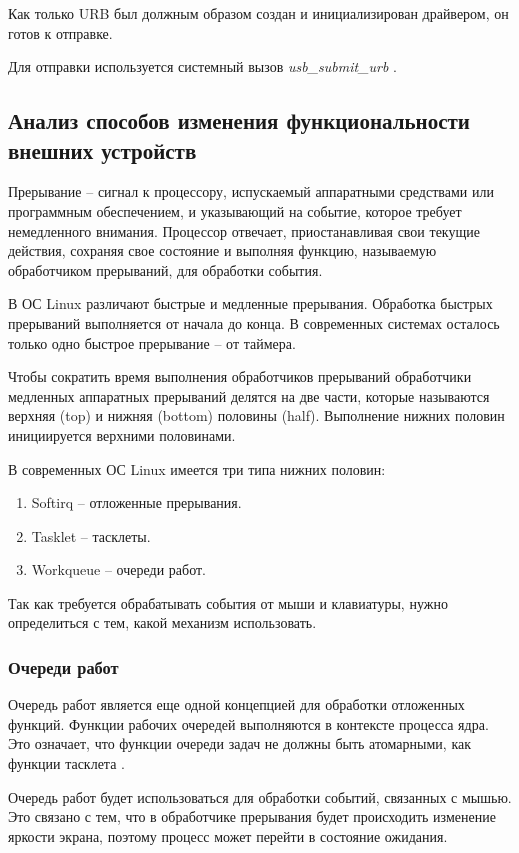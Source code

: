 Как только URB был должным образом создан и инициализирован драйвером, он готов к отправке. 

Для отправки используется системный вызов \textit{usb\_submit\_urb} \cite{submit}.

\subsection{Анализ способов изменения функциональности внешних устройств}
Прерывание – сигнал к процессору, испускаемый аппаратными средствами или программным обеспечением, и указывающий на событие, которое
требует немедленного внимания.  
Процессор отвечает, приостанавливая свои текущие действия, сохраняя свое состояние и выполняя функцию, называемую обработчиком прерываний, для обработки события.

В ОС Linux различают быстрые и медленные прерывания. 
Обработка быстрых прерываний выполняется от начала до конца. 
В современных системах осталось только одно быстрое прерывание -- от таймера. 

Чтобы сократить время выполнения обработчиков прерываний обработчики медленных аппаратных прерываний делятся на две части, которые называются верхняя (top) и нижняя (bottom) половины (half).
Выполнение нижних половин инициируется верхними половинами.

В современных ОС Linux имеется три типа нижних половин:
\begin{enumerate}
	\item Softirq -- отложенные прерывания.
	\item Tasklet -- тасклеты.
	\item Workqueue -- очереди работ.
\end{enumerate}

Так как требуется обрабатывать события от мыши и клавиатуры, нужно определиться с тем, какой механизм использовать.

\subsubsection{Очереди работ}
Очередь работ является еще одной концепцией для обработки отложенных функций. 
Функции рабочих очередей выполняются в контексте процесса ядра. 
Это означает, что функции очереди задач не должны быть атомарными, как функции тасклета \cite{work}. 

Очередь работ будет использоваться для обработки событий, связанных с мышью. 
Это связано с тем, что в обработчике прерывания будет происходить изменение яркости экрана, поэтому процесс может перейти в состояние ожидания.

